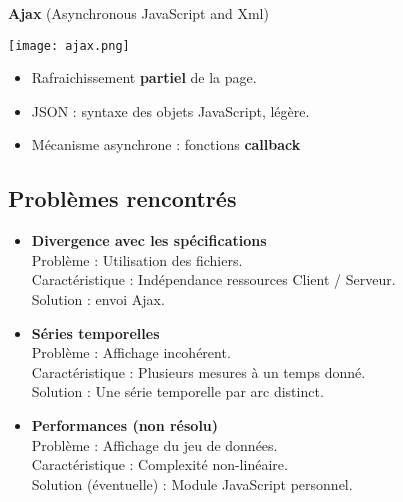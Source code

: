 		\begin{frame}
			\textbf{Ajax} (Asynchronous JavaScript and Xml)\\
				\begin{center}\texttt{[image: ajax.png]}\end{center}
				
				\begin{itemize}
				\item Rafraichissement \textbf{partiel} de la page.\\ %
				\item JSON : syntaxe des objets JavaScript, légère. \\ 
				\item Mécanisme asynchrone : fonctions \textbf{callback}
				\end{itemize}
		\end{frame}
		
		\subsection*{Problèmes rencontrés}
		\begin{frame}
			\begin{itemize}
			\item \textbf{Divergence avec les spécifications}\\
				\hspace{1em} Problème : Utilisation des fichiers.\\
				\hspace{1em} Caractéristique : Indépendance ressources Client / Serveur.\\
				\hspace{1em} Solution : envoi Ajax.\vspace{1em} \pause
				
			\item \textbf{Séries temporelles}\\
				\hspace{1em} Problème : Affichage incohérent.\\
				\hspace{1em} Caractéristique : Plusieurs mesures à un temps donné.\\
				\hspace{1em} Solution : Une série temporelle par arc distinct.\vspace{1em} \pause
				
			\item \textbf{Performances (non résolu)}\\
				\hspace{1em} Problème : Affichage du jeu de données.\\
				\hspace{1em} Caractéristique : Complexité non-linéaire.\\
				\hspace{1em} Solution (éventuelle) : Module JavaScript personnel.\pause
			\end{itemize}
		\end{frame}
	
